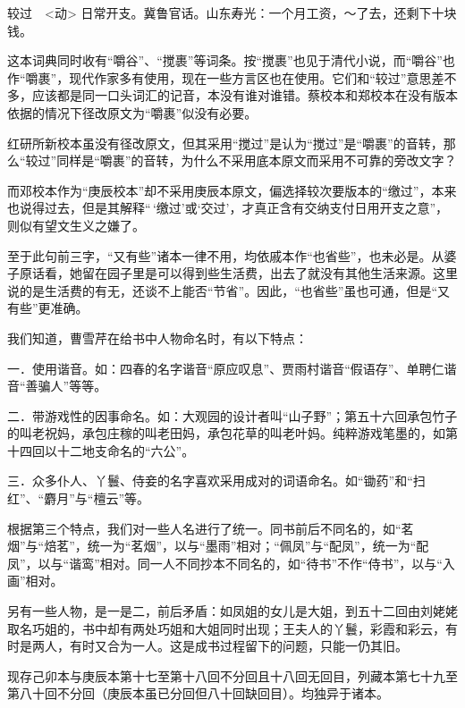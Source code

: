 较过　\textless{}动\textgreater{}
日常开支。冀鲁官话。山东寿光：一个月工资，～了去，还剩下十块钱。

这本词典同时收有“嚼谷”、“搅裹”等词条。按“搅裹”也见于清代小说，而“嚼谷”也作“嚼裹”，现代作家多有使用，现在一些方言区也在使用。它们和“较过”意思差不多，应该都是同一口头词汇的记音，本没有谁对谁错。蔡校本和郑校本在没有版本依据的情况下径改原文为“嚼裹”似没有必要。

红研所新校本虽没有径改原文，但其采用“搅过”是认为“搅过”是“嚼裹”的音转，那么“较过”同样是“嚼裹”的音转，为什么不采用底本原文而采用不可靠的旁改文字？

而邓校本作为“庚辰校本”却不采用庚辰本原文，偏选择较次要版本的“缴过”，本来也说得过去，但是其解释“\,‘缴过’或‘交过’，才真正含有交纳支付日用开支之意”，则似有望文生义之嫌了。

至于此句前三字，“又有些”诸本一律不用，均依戚本作“也省些”，也未必是。从婆子原话看，她留在园子里是可以得到些生活费，出去了就没有其他生活来源。这里说的是生活费的有无，还谈不上能否“节省”。因此，“也省些”虽也可通，但是“又有些”更准确。

{{}}

我们知道，曹雪芹在给书中人物命名时，有以下特点：

一．使用谐音。如：四春的名字谐音“原应叹息”、贾雨村谐音“假语存”、单聘仁谐音“善骗人”等等。

二．带游戏性的因事命名。如：大观园的设计者叫“山子野”；第五十六回承包竹子的叫老祝妈，承包庄稼的叫老田妈，承包花草的叫老叶妈。纯粹游戏笔墨的，如第十四回以十二地支命名的“六公”。

三．众多仆人、丫鬟、侍妾的名字喜欢采用成对的词语命名。如“锄药”和“扫红”、“麝月”与“檀云”等。

根据第三个特点，我们对一些人名进行了统一。同书前后不同名的，如“茗烟”与“焙茗”，统一为“茗烟”，以与“墨雨”相对；“佩凤”与“配凤”，统一为“配凤”，以与“谐鸾”相对。同一人不同抄本不同名的，如“待书”不作“侍书”，以与“入画”相对。

另有一些人物，是一是二，前后矛盾：如凤姐的女儿是大姐，到五十二回由刘姥姥取名巧姐的，书中却有两处巧姐和大姐同时出现；王夫人的丫鬟，彩霞和彩云，有时是两人，有时又合为一人。这是成书过程留下的问题，只能一仍其旧。

{}
现存己卯本与庚辰本第十七至第十八回不分回且十八回无回目，列藏本第七十九至第八十回不分回（庚辰本虽已分回但八十回缺回目）。均独异于诸本。

